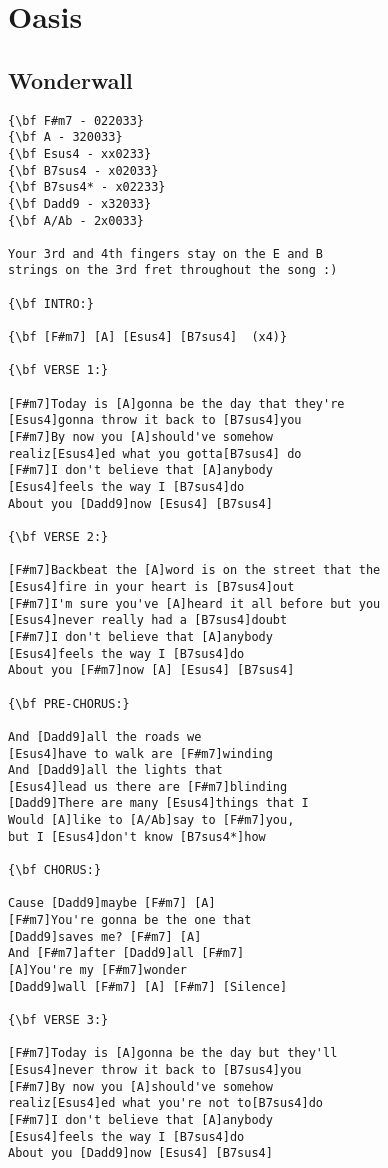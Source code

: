 \documentclass[a4paper]{article}
\begin{document}
\section{Oasis} %
\label{sec:Oasis}
\begin{multicols}{2}
\subsection{Wonderwall} %
\label{sub:Wonderwall}
\begin{Verbatim}[commandchars=\\\{\}]
{\bf F#m7 - 022033}
{\bf A - 320033}
{\bf Esus4 - xx0233}
{\bf B7sus4 - x02033}
{\bf B7sus4* - x02233}
{\bf Dadd9 - x32033}
{\bf A/Ab - 2x0033}

Your 3rd and 4th fingers stay on the E and B 
strings on the 3rd fret throughout the song :)

{\bf INTRO:}

{\bf [F#m7] [A] [Esus4] [B7sus4]  (x4)}

{\bf VERSE 1:}

[F#m7]Today is [A]gonna be the day that they're 
[Esus4]gonna throw it back to [B7sus4]you
[F#m7]By now you [A]should've somehow 
realiz[Esus4]ed what you gotta[B7sus4] do
[F#m7]I don't believe that [A]anybody 
[Esus4]feels the way I [B7sus4]do 
About you [Dadd9]now [Esus4] [B7sus4]

{\bf VERSE 2:}

[F#m7]Backbeat the [A]word is on the street that the 
[Esus4]fire in your heart is [B7sus4]out
[F#m7]I'm sure you've [A]heard it all before but you 
[Esus4]never really had a [B7sus4]doubt
[F#m7]I don't believe that [A]anybody 
[Esus4]feels the way I [B7sus4]do
About you [F#m7]now [A] [Esus4] [B7sus4]

{\bf PRE-CHORUS:}

And [Dadd9]all the roads we 
[Esus4]have to walk are [F#m7]winding
And [Dadd9]all the lights that 
[Esus4]lead us there are [F#m7]blinding
[Dadd9]There are many [Esus4]things that I 
Would [A]like to [A/Ab]say to [F#m7]you, 
but I [Esus4]don't know [B7sus4*]how

{\bf CHORUS:}

Cause [Dadd9]maybe [F#m7] [A]
[F#m7]You're gonna be the one that 
[Dadd9]saves me? [F#m7] [A]
And [F#m7]after [Dadd9]all [F#m7]
[A]You're my [F#m7]wonder
[Dadd9]wall [F#m7] [A] [F#m7] [Silence]

{\bf VERSE 3:}

[F#m7]Today is [A]gonna be the day but they'll 
[Esus4]never throw it back to [B7sus4]you
[F#m7]By now you [A]should've somehow 
realiz[Esus4]ed what you're not to[B7sus4]do
[F#m7]I don't believe that [A]anybody 
[Esus4]feels the way I [B7sus4]do 
About you [Dadd9]now [Esus4] [B7sus4]


\end{Verbatim}
\end{multicols}
\end{document}
